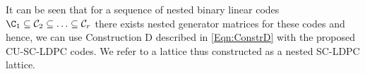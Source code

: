 \documentclass[conference]{IEEEtran}
\begin{document}
%

It can be seen that for a sequence of nested binary linear codes $\C_{1}\subseteq \mathcal{C}_{2}\subseteq\ldots \subseteq\mathcal{C}_{r}$ there exists nested generator matrices for these codes and hence, we can use Construction D described in \eqref{Eqn:ConstrD} with the proposed CU-SC-LDPC codes. We refer to a lattice thus constructed as a nested SC-LDPC lattice.

\end{document}
